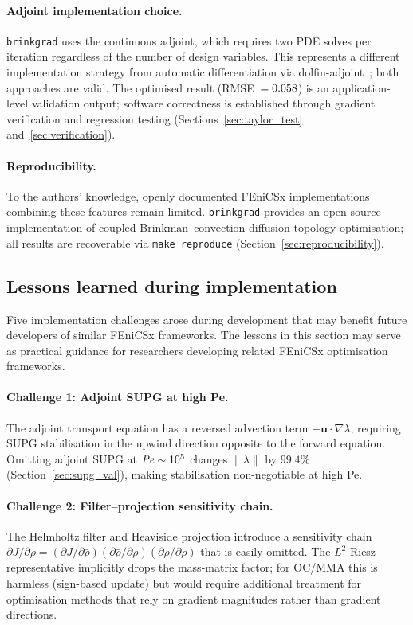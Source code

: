 \paragraph{Adjoint implementation choice.}
\texttt{brinkgrad} uses the continuous adjoint,
which requires two PDE solves per iteration regardless of the number
of design variables.
This represents a different implementation strategy from
automatic differentiation via dolfin-adjoint~\cite{farrell2013};
both approaches are valid.
The optimised result (RMSE~$=0.058$) is an
application-level validation output;
software correctness is established through gradient
verification and regression testing
(Sections~\ref{sec:taylor_test} and~\ref{sec:verification}).

\paragraph{Reproducibility.}
To the authors' knowledge, openly documented FEniCSx implementations combining these features remain limited.
\texttt{brinkgrad} provides an open-source implementation
of coupled Brinkman--convection-diffusion topology optimisation;
all results are recoverable via \texttt{make reproduce}
(Section~\ref{sec:reproducibility}).

\subsection{Lessons learned during implementation}
\label{sec:lessons}

Five implementation challenges arose during development
that may benefit future developers of similar FEniCSx frameworks.
The lessons in this section may serve as practical guidance
for researchers developing related FEniCSx optimisation frameworks.

\paragraph{Challenge 1: Adjoint SUPG at high Pe.}
The adjoint transport equation has a reversed advection term
$-\mathbf{u}\cdot\nabla\lambda$, requiring SUPG stabilisation
in the upwind direction opposite to the forward equation.
Omitting adjoint SUPG at $\mathit{Pe}\sim10^5$ changes $\|\lambda\|$
by $99.4\%$ (Section~\ref{sec:supg_val}), making stabilisation
non-negotiable at high Pe.

\paragraph{Challenge 2: Filter--projection sensitivity chain.}
The Helmholtz filter and Heaviside projection introduce a
sensitivity chain $\partial J/\partial\rho =
(\partial J/\partial\bar{\rho})(\partial\bar{\rho}/\partial\tilde{\rho})
(\partial\tilde{\rho}/\partial\rho)$ that is easily omitted.
The $L^2$ Riesz representative implicitly drops the mass-matrix
factor; for OC/MMA this is harmless (sign-based update) but
would require additional treatment for optimisation methods that rely on gradient magnitudes rather than gradient directions.


